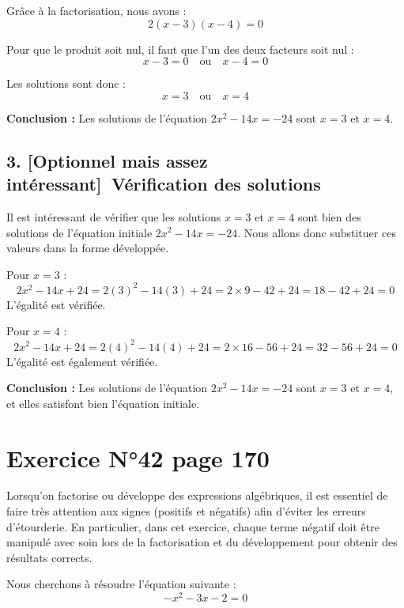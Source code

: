 \documentclass[a4paper,12pt]{article}
\begin{document}
    Grâce à la factorisation, nous avons :
    \[
    2(x - 3)(x - 4) = 0
    \]
    
    Pour que le produit soit nul, il faut que l'un des deux facteurs soit nul :
    \[
    x - 3 = 0 \quad \text{ou} \quad x - 4 = 0
    \]
    
    Les solutions sont donc :
    \[
    x = 3 \quad \text{ou} \quad x = 4
    \]
    
    \textbf{Conclusion :} Les solutions de l'équation \( 2x^2 - 14x = -24 \) sont \( x = 3 \) et \( x = 4 \).
  

    \subsection*{3. [Optionnel mais assez intéressant] Vérification des solutions}

    Il est intéressant de vérifier que les solutions \( x = 3 \) et \( x = 4 \) sont bien des solutions de l'équation initiale \( 2x^2 - 14x = -24 \). Nous allons donc substituer ces valeurs dans la forme développée.

    Pour \( x = 3 \) :
\[
2x^2 - 14x + 24 = 2(3)^2 - 14(3) + 24 = 2 \times 9 - 42 + 24 = 18 - 42 + 24 = 0
\]
L'égalité est vérifiée.

Pour \( x = 4 \) :
\[
2x^2 - 14x + 24 = 2(4)^2 - 14(4) + 24 = 2 \times 16 - 56 + 24 = 32 - 56 + 24 = 0
\]
L'égalité est également vérifiée.

\textbf{Conclusion :} Les solutions de l'équation \( 2x^2 - 14x = -24 \) sont \( x = 3 \) et \( x = 4 \), et elles satisfont bien l'équation initiale.

    \section*{Exercice N°42 page 170}
    
    \begin{tcolorbox}[colback=yellow!10!white, colframe=yellow!50!black, title=Attention aux signes]
    Lorsqu'on factorise ou développe des expressions algébriques, il est essentiel de faire très attention aux signes (positifs et négatifs) afin d'éviter les erreurs d'étourderie. En particulier, dans cet exercice, chaque terme négatif doit être manipulé avec soin lors de la factorisation et du développement pour obtenir des résultats corrects.
    \end{tcolorbox}
    
    Nous cherchons à résoudre l'équation suivante :
    \[
    -x^2 - 3x - 2 = 0
    \]
    
\end{document}

